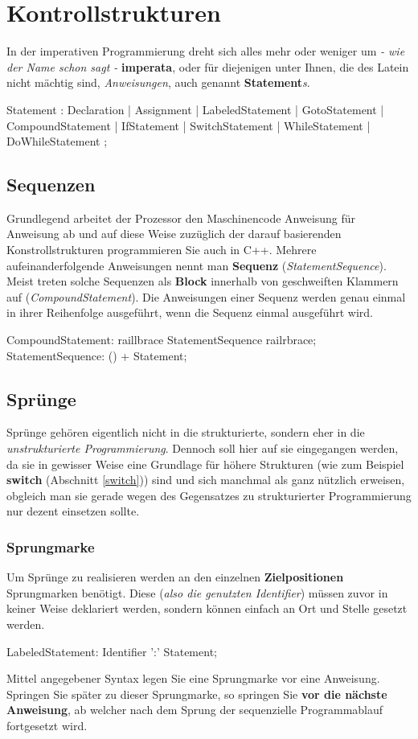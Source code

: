 \documentclass[a4paper]{report}
\begin{document}
\section{Kontrollstrukturen}

In der imperativen Programmierung dreht sich alles mehr oder weniger um \textit{- wie der Name schon sagt -} \textbf{imperata}, oder für diejenigen unter Ihnen, die des Latein nicht mächtig sind, \textit{Anweisungen}, auch genannt \textbf{Statement}\textit{s}.

\begin{rail}
	Statement : Declaration |%
				Assignment |
				LabeledStatement |
				GotoStatement |
				CompoundStatement |
				IfStatement |
				SwitchStatement |
				WhileStatement |
				DoWhileStatement
				;
				
\end{rail}

\subsection{Sequenzen}
Grundlegend arbeitet der Prozessor den Maschinencode Anweisung für Anweisung ab und auf diese Weise zuzüglich der darauf basierenden Konstrollstrukturen programmieren Sie auch in C++. Mehrere aufeinanderfolgende Anweisungen nennt man \textbf{Sequenz} (\textit{StatementSequence}). Meist treten solche Sequenzen als \textbf{Block} innerhalb von geschweiften Klammern auf (\textit{CompoundStatement}). Die Anweisungen einer Sequenz werden genau einmal in ihrer Reihenfolge ausgeführt, wenn die Sequenz einmal ausgeführt wird.
\begin{rail}
	CompoundStatement: raillbrace StatementSequence railrbrace;
	StatementSequence:	() + Statement;	
\end{rail}
\subsection{Sprünge}
Sprünge gehören eigentlich nicht in die strukturierte, sondern eher in die \textit{unstrukturierte Programmierung}. Dennoch soll hier auf sie eingegangen werden, da sie in gewisser Weise eine Grundlage für höhere Strukturen (wie zum Beispiel \textbf{switch} (Abschnitt \ref{switch})) sind und sich manchmal als ganz nützlich erweisen, obgleich man sie gerade wegen des Gegensatzes zu strukturierter Programmierung nur dezent einsetzen sollte. 

\subsubsection{Sprungmarke}
Um Sprünge zu realisieren werden an den einzelnen \textbf{Zielpositionen} Sprungmarken benötigt. Diese (\textit{also die genutzten Identifier}) müssen zuvor in keiner Weise deklariert werden, sondern können einfach an Ort und Stelle gesetzt werden.
\begin{rail}
	LabeledStatement: Identifier ':' Statement;
\end{rail}
Mittel angegebener Syntax legen Sie eine Sprungmarke vor eine Anweisung. Springen Sie später zu dieser Sprungmarke, so springen Sie \textbf{vor die nächste Anweisung}, ab welcher nach dem Sprung der sequenzielle Programmablauf fortgesetzt wird.
\end{document}
